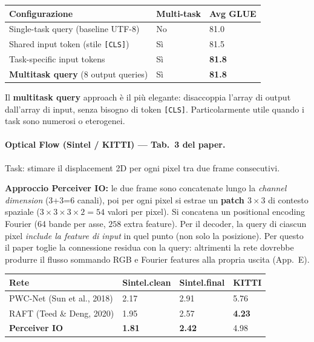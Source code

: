 \documentclass[
  11pt,
]{article}
\begin{document}
{\small
\begin{longtable}{@{}p{5.5cm} p{3cm} p{3cm}@{}}
\toprule
\textbf{Configurazione} & \textbf{Multi-task} & \textbf{Avg GLUE} \\
\midrule
\endhead
Single-task query (baseline UTF-8) & No & 81.0 \\[2pt]
Shared input token (stile \texttt{[CLS]}) & Sì & 81.5 \\[2pt]
Task-specific input tokens & Sì & \textbf{81.8} \\[2pt]
\textbf{Multitask query} (8 output queries) & Sì & \textbf{81.8} \\
\bottomrule
\end{longtable}
}

Il \textbf{multitask query} approach è il più elegante: disaccoppia l'array di output dall'array di input, senza bisogno di token \texttt{[CLS]}. Particolarmente utile quando i task sono numerosi o eterogenei.

\paragraph{Optical Flow (Sintel / KITTI) --- Tab.\ 3 del paper.} Task: stimare il displacement 2D per ogni pixel tra due frame consecutivi.

\textbf{Approccio Perceiver IO:} le due frame sono concatenate lungo la \emph{channel dimension} (3+3=6 canali), poi per ogni pixel si estrae un \textbf{patch $3\times 3$} di contesto spaziale ($3 \times 3 \times 3 \times 2 = 54$ valori per pixel). Si concatena un positional encoding Fourier (64 bande per asse, $258$ extra feature). Per il decoder, la query di ciascun pixel \emph{include la feature di input} in quel punto (non solo la posizione). Per questo il paper toglie la connessione residua con la query: altrimenti la rete dovrebbe produrre il flusso sommando RGB e Fourier features alla propria uscita (App.~E).

{\small
\begin{longtable}{@{}p{3.8cm} p{2.8cm} p{2.8cm} p{2.5cm}@{}}
\toprule
\textbf{Rete} & \textbf{Sintel.clean} & \textbf{Sintel.final} & \textbf{KITTI} \\
\midrule
\endhead
PWC-Net (Sun et al., 2018) & 2.17 & 2.91 & 5.76 \\[2pt]
RAFT (Teed \& Deng, 2020) & 1.95 & 2.57 & \textbf{4.23} \\[2pt]
\textbf{Perceiver IO} & \textbf{1.81} & \textbf{2.42} & 4.98 \\
\bottomrule
\end{longtable}
}
\end{document}
